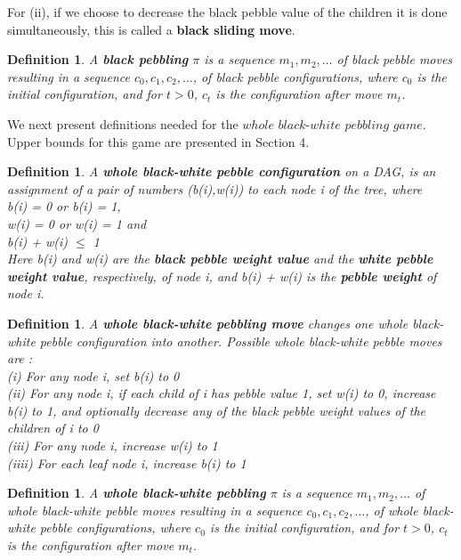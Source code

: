 \documentclass[12pt]{article}
\newtheorem{definition}[theorem]{Definition}
\begin{document}
For (ii), if we choose to decrease the black pebble value of the children it is done simultaneously, this is called a {\bf black sliding move}.

\begin{definition}
\noindent
A {\bf black pebbling} $\pi$ is a sequence $m_1,m_2,\ldots$
of black pebble moves resulting in a sequence $c_0,c_1,c_2,\ldots$,
of black pebble configurations, where $c_0$ is the initial configuration,
and for $t>0$, $c_t$ is the configuration after move $m_t$.\\
\end{definition}




We next present definitions needed for the $whole$ $black$-$white$ $pebbling$ $game$. Upper bounds for this game are presented in Section 4.

\begin{definition}

A {\bf whole black-white pebble configuration} on a DAG, is an
assignment of a pair of numbers (b(i),w(i)) to each node i of the tree, where\\
b(i) = 0 or b(i) = 1,\\
w(i) = 0 or w(i) = 1 and\\
b(i) + w(i) $\leq$ 1\\
Here b(i) and w(i) are the {\bf  black pebble weight value} and the {\bf white pebble weight value}, respectively, of node i,
and b(i) + w(i) is the {\bf pebble weight} of node i.
\end{definition}

\begin{definition}
\noindent
A {\bf whole black-white pebbling move} changes one whole black-white pebble configuration into another. Possible whole black-white pebble moves are :\\
(i) For any node i, set b(i) to 0\\
(ii) For any node i, if each child of i has pebble value 1, set w(i) to 0, increase b(i) to 1, and optionally decrease any of the black pebble weight values of the children of i to 0\\
(iii) For any node i, increase w(i) to 1\\
(iiii) For each leaf node i, increase b(i) to 1
\end{definition}

\begin{definition}
\noindent
A {\bf whole black-white pebbling} $\pi$ is a sequence $m_1,m_2,\ldots$
of whole black-white pebble moves resulting in a sequence $c_0,c_1,c_2,\ldots$,
of whole black-white pebble configurations, where $c_0$ is the initial configuration,
and for $t>0$, $c_t$ is the configuration after move $m_t$.\\
\end{definition}
\end{document}
